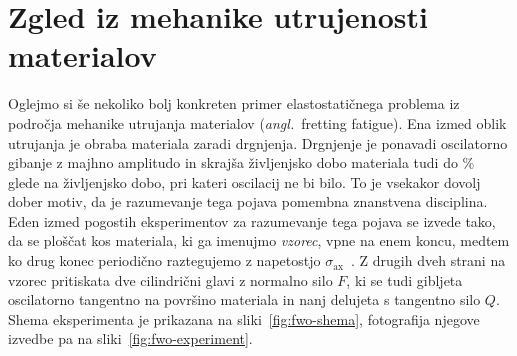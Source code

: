 \documentclass[12pt,a4paper,twoside]{article}
\theoremstyle{definition} %
\theoremstyle{plain} %
\numberwithin{equation}{section}
\newcommand{\sax}{\ensuremath{\sigma_{\text{ax}}}}
\newcommand{\ang}[1]{(\hspace{-1.5px}\textit{angl.}\ #1)}
\let\oldsection\section
\def\section{\cleardoublepage\oldsection}
\begin{document}
\section{Zgled iz mehanike utrujenosti materialov}
\label{sec:fwo}
Oglejmo si še nekoliko bolj konkreten primer elastostatičnega problema iz področja mehanike utrujanja
materialov \ang{fretting fatigue}. Ena izmed oblik utrujanja je obraba materiala zaradi drgnjenja.
Drgnjenje je ponavadi oscilatorno gibanje z majhno amplitudo in skrajša življenjsko dobo materiala tudi
do \unit[50]{\%}~\cite{jeung2015crack} glede na življenjsko dobo, pri kateri oscilacij ne bi bilo.
To je vsekakor dovolj dober motiv, da je razumevanje tega pojava pomembna znanstvena disciplina.
Eden izmed pogostih eksperimentov za razumevanje tega pojava se izvede tako, da se ploščat kos
materiala, ki ga imenujmo \emph{vzorec}, vpne na enem koncu, medtem ko drug konec periodično
raztegujemo z napetostjo $\sax$~\cite{hojjati2014prediction}. Z drugih dveh strani na vzorec
pritiskata dve cilindrični glavi z normalno silo $F$, ki se tudi gibljeta oscilatorno tangentno na
površino materiala in nanj delujeta s tangentno silo $Q$. Shema eksperimenta je prikazana na
sliki~\ref{fig:fwo-shema}, fotografija njegove izvedbe pa na sliki~\ref{fig:fwo-experiment}.
\end{document}
